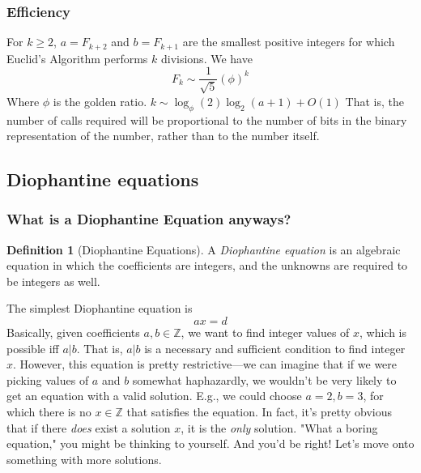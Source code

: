 \documentclass[10pt]{article}
\newcommand\ZZ{{\mathbb Z}}
\theoremstyle{definition}
\newtheorem{definition}{Definition}[section]
\begin{document}
\subsubsection{Efficiency}
For $k\geq 2$, $a=F_{k+2}$ and $b=F_{k+1}$ are the smallest positive integers for which Euclid's Algorithm performs $k$ divisions.  We have 
\[F_k \sim \frac{1}{\sqrt{5}}(\phi)^k\]
Where $\phi$ is the golden ratio.  $k\sim \log_{\phi}(2) \log_2(a+1)+O(1)$  That is, the number of calls required will be proportional to the number of bits in the binary representation of the number, rather than to the number itself.  
\subsection{Diophantine equations}
\subsubsection{What is a Diophantine Equation anyways?}
\begin{definition}[Diophantine Equations] A \textit{Diophantine equation} is an algebraic equation in which the coefficients are integers, and the unknowns are required to be integers as well.  
\end{definition}
The simplest Diophantine equation is 
\[ax = d\]
Basically, given coefficients $a,b\in\ZZ$, we want to find integer values of $x$, which is possible iff $a|b$.  That is, $a|b$ is a necessary and sufficient condition to find integer $x$.  However, this equation is pretty restrictive---we can imagine that if we were picking values of $a$ and $b$ somewhat haphazardly, we wouldn't be very likely to get an equation with a valid solution.  E.g., we could choose $a=2,b=3$, for which there is no $x\in\ZZ$ that satisfies the equation.  In fact, it's pretty obvious that if there \textit{does} exist a solution $x$, it is the \textit{only} solution.  "What a boring equation," you might be thinking to yourself.  And you'd be right!  Let's move onto something with more solutions.
\end{document}
